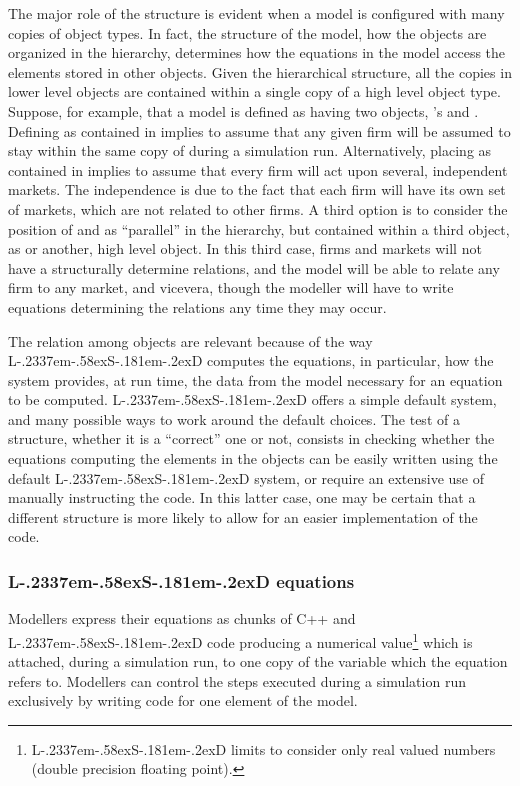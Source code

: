 \documentclass [11pt,a4paper] {book}
\def\LsD{{L\kern-.2337em\lower-.58ex\hbox{S}\kern-.181em\lower-.2ex\hbox{D}}\xspace}
\begin{document}
The major role of the structure is evident when a model is configured with many copies of object types. In fact, the structure of the model, how the objects are organized in the hierarchy, determines how the equations in the model access the elements stored in other objects. Given the hierarchical structure, all the copies in lower level objects are contained within a single copy of a high level object type. Suppose, for example, that a model is defined as having two objects, 's and . Defining  as contained in  implies to assume that any given firm will be assumed to stay within the same copy of  during a simulation run. Alternatively, placing  as contained in  implies to assume that every firm will act upon several, independent markets. The independence is due to the fact that each firm will have its own set of markets, which are not related to other firms. A third option is to consider the position of  and  as ``parallel'' in the hierarchy, but contained within a third object, as  or another, high level object. In this third case, firms and markets will not have a structurally determine relations, and the model will be able to relate any firm to any market, and vicevera, though the modeller will have to write equations determining the relations any time they may occur.


The relation among objects are relevant because of the way \LsD computes the equations, in particular, how the system provides, at run time, the data from the model necessary for an equation to be computed. \LsD offers a simple default system, and many possible ways to work around the default choices. The test of a structure, whether it is a ``correct'' one or not, consists in checking whether the equations computing the elements in the objects can be easily written using the default \LsD system, or require an extensive use of manually instructing the code. In this latter case, one may be certain that a different structure is more likely to allow for an easier implementation of the code.


\subsubsection{\LsD equations}

Modellers express their equations as chunks of C++ and \LsD code producing a numerical
value\footnote{\LsD limits to consider only real valued numbers (double precision floating
point).} which is attached, during a simulation run, to one copy of the variable which
the equation refers to. Modellers can control the steps executed during a simulation run exclusively by writing code for one element of the model. 
\end{document}
